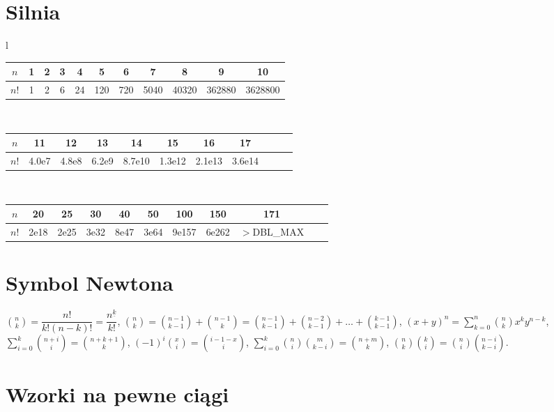 \section{Silnia}
		\begin{center}
			\begin{tabular}{l}
				\begin{tabular}{c|c@{\ }c@{\ }c@{\ }c@{\ }c@{\ }c@{\ }c@{\ }c@{\ }c@{\ }c}
					$n$  & 1 & 2 & 3 & 4  & 5   & 6   & 7    & 8     & 9      & 10\\
					\hline
					$n!$ & 1 & 2 & 6 & 24 & 120 & 720 & 5040 & 40320 & 362880 & 3628800\\
				\end{tabular}\\
					\begin{tabular}{c|c@{\ }c@{\ }c@{\ }c@{\ }c@{\ }c@{\ }c@{\ }c@{\ }c@{\ }c}
					$n$  & 11    & 12    & 13    & 14     & 15     & 16     & 17\\
					\hline
					$n!$ & 4.0e7 & 4.8e8 & 6.2e9 & 8.7e10 & 1.3e12 & 2.1e13 & 3.6e14\\
				\end{tabular}\\
				\begin{tabular}{c|c@{\ }c@{\ }c@{\ }c@{\ }c@{\ }c@{\ }c@{\ }c@{\ }c@{\ }c}
					$n$  & 20   & 25   & 30   & 40   & 50   & 100   & 150   & 171\\
					\hline
					$n!$ & 2e18 & 2e25 & 3e32 & 8e47 & 3e64 & 9e157 & 6e262 & \scriptsize{$>$DBL\_MAX}\\
				\end{tabular}
			\end{tabular}
		\end{center}

\section{Symbol Newtona}
		$ \binom{n}{k}=\dfrac{n!}{k!\left(n-k\right)!}=\dfrac{n^{\underline{k}}}{k!}$,
		$ \binom{n}{k}=\binom{n-1}{k-1}+\binom{n-1}{k}=\binom{n-1}{k-1}+\binom{n-2}{k-1}+\dots+\binom{k-1}{k-1}$,
		$ (x+y)^n=\sum_{k=0}^n \binom{n}{k} x^k y^{n-k} $,
		$ \sum_{i=0}^k \binom{n+i}{i} = \binom{n+k+1}{k} $,
		$ \left(-1\right)^i \binom{x}{i} = \binom{i - 1 - x}{i} $,
		$ \sum_{i=0}^k \binom{n}{i} \binom{m}{k - i} = \binom{n + m}{k} $,
		$ \binom{n}{k} \binom{k}{i} = \binom{n}{i} \binom{n - i}{k - i} $.


\section{Wzorki na pewne ciągi}
